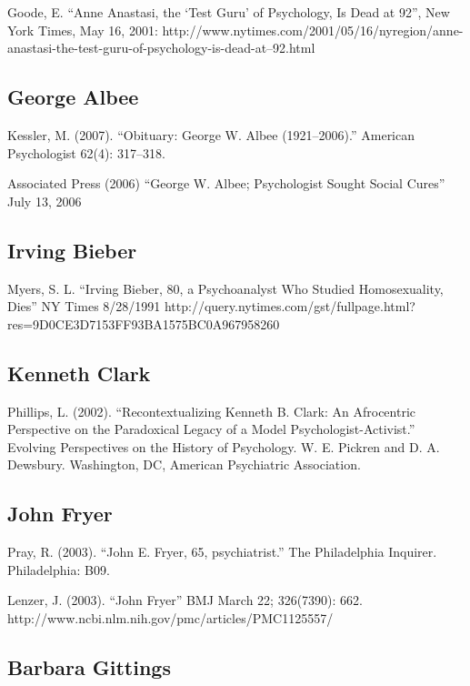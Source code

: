 \begin{refsection}
\begin{appendices}
Goode, E. ``Anne Anastasi, the `Test Guru' of Psychology, Is Dead at 92'', New York Times, May 16, 2001: http:\slash \slash www.nytimes.com\slash 2001\slash 05\slash 16\slash nyregion\slash anne-anastasi-the-test-guru-of-psychology-is-dead-at--92.html 

\subsection{George Albee}
\label{georgealbee}

Kessler, M. (2007). ``Obituary: George W. Albee (1921--2006).'' American Psychologist 62(4): 317--318. 

Associated Press (2006) ``George W. Albee; Psychologist Sought Social Cures'' July 13, 2006

\subsection{Irving Bieber}
\label{irvingbieber}

Myers, S. L. ``Irving Bieber, 80, a Psychoanalyst Who Studied Homosexuality, Dies'' NY Times 8\slash 28\slash 1991 http:\slash \slash query.nytimes.com\slash gst\slash fullpage.html?res=9D0CE3D7153FF93BA1575BC0A967958260

\subsection{Kenneth Clark}
\label{kennethclark}

Phillips, L. (2002). ``Recontextualizing Kenneth B. Clark: An Afrocentric Perspective on the Paradoxical Legacy of a Model Psychologist-Activist.'' Evolving Perspectives on the History of Psychology. W. E. Pickren and D. A. Dewsbury. Washington, DC, American Psychiatric Association. 

\subsection{John Fryer}
\label{johnfryer}

Pray, R. (2003). ``John E. Fryer, 65, psychiatrist.'' The Philadelphia Inquirer. Philadelphia: B09.

Lenzer, J. (2003). ``John Fryer'' BMJ March 22; 326(7390): 662. http:\slash \slash www.ncbi.nlm.nih.gov\slash pmc\slash articles\slash PMC1125557\slash  

\subsection{Barbara Gittings}
\label{barbaragittings}


\end{appendices}
\end{refsection}
